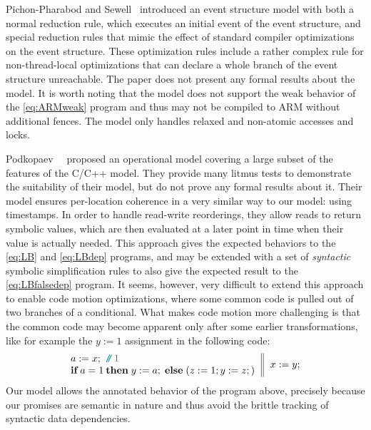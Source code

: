 

Pichon-Pharabod and Sewell~\cite{Pichon} introduced an event structure model with both a normal reduction rule, which executes an initial event of the event structure, and special reduction rules that mimic the effect of standard compiler optimizations on the event structure.
These optimization rules include a rather complex rule for non-thread-local optimizations that can declare a whole branch of the event structure unreachable.
The paper does not present any formal results about the model.
It is worth noting that the model does not support the weak behavior of the \ref{eq:ARMweak} program and thus may not be compiled to ARM without additional fences.  The model only handles relaxed and non-atomic accesses and locks.

Podkopaev~\etal~\cite{sergey:2016} proposed an operational model covering a large subset of the features of the C/C++ model.  They provide many litmus tests to demonstrate the suitability
of their model, but do not prove any formal results about it.
Their model ensures per-location coherence in a very similar way to our model: using timestamps.
In order to handle read-write reorderings, they allow reads to return symbolic values, which are then evaluated at a later point in time when their value is actually needed.
This approach gives the expected behaviors to the \ref{eq:LB} and \ref{eq:LBdep} programs, 
and may be extended with a set of \emph{syntactic} symbolic simplification rules to also give the expected result to the \ref{eq:LBfalsedep} program.
It seems, however, very difficult to extend this approach to enable code motion optimizations, where some common code is pulled out of two branches of a conditional. 
What makes code motion more challenging is that the common code may become apparent only after some earlier transformations, 
like for example the $y:=1$ assignment in the following code:
$$
\inarrII{ a := x; \comment{1} \\ \ite{a = 1}{y := a;}{(z := 1; y := z;)} }{ x := y; } 
$$
Our model allows the annotated behavior of the program above,
precisely because our promises are semantic in nature and thus avoid the brittle
tracking of syntactic data dependencies.


